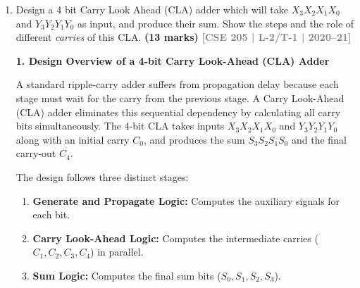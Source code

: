 \documentclass[12pt,a3paper]{article}
\newcommand{\yr}[1]{\hfill\textcolor{gray}{\small\textbf{[#1]}}}
\newcommand{\mk}[1]{\textcolor{orange!70!black}{\small\textbf{(#1 marks)}}}
\begin{document}
\begin{enumerate}
\begin{tcolorbox}[enhanced,breakable,ansbox,colback=cD!4,colframe=cD,boxrule=0.8pt,arc=5pt,title={\textbf{Answer}},fonttitle=\bfseries\color{white},colbacktitle=cD]
\vspace{0.5em}
\textbf{Carry 4 ($C_4$):} For $i = 3$
\begin{align*}
    C_4 &= G_3 + P_3 \cdot C_3 \\
    &= G_3 + P_3 \cdot (G_2 + P_2 \cdot G_1 + P_2 \cdot P_1 \cdot G_0 + P_2 \cdot P_1 \cdot P_0 \cdot C_0) \quad &&\text{(Substitute } C_3\text{)} \\
    \mathbf{C_4} &= \mathbf{G_3 + P_3 \cdot G_2 + P_3 \cdot P_2 \cdot G_1 + P_3 \cdot P_2 \cdot P_1 \cdot G_0 + P_3 \cdot P_2 \cdot P_1 \cdot P_0 \cdot C_0} \quad &&\text{(Distributive Law)}
\end{align*}

\vspace{0.5em}
\textbf{Summary of Results:}
The derivations yield the final expressions mathematically structured as Sum-of-Products (SOP). None of the carry signals ($C_1, C_2, C_3, C_4$) depend sequentially on the preceding full-adder outputs; they only require the base input signals ($G_i$, $P_i$, and $C_0$), allowing them to be synthesized simultaneously via rapid two-level logic hardware.

\end{tcolorbox}

\item Design a 4 bit Carry Look Ahead (CLA) adder which will take $X_3X_2X_1X_0$ and $Y_3Y_2Y_1Y_0$ as input, and produce their sum. Show the steps and the role of different \textit{carries} of this CLA.
\mk{13} \yr{CSE 205 | L-2/T-1 | 2020--21}

\begin{tcolorbox}[enhanced,breakable,ansbox,colback=cD!4,colframe=cD,boxrule=0.8pt,arc=5pt,title={\textbf{Answer}},fonttitle=\bfseries\color{white},colbacktitle=cD]

\textbf{1. Design Overview of a 4-bit Carry Look-Ahead (CLA) Adder}
\vspace{0.5em}

A standard ripple-carry adder suffers from propagation delay because each stage must wait for the carry from the previous stage. A Carry Look-Ahead (CLA) adder eliminates this sequential dependency by calculating all carry bits simultaneously. The 4-bit CLA takes inputs $X_3X_2X_1X_0$ and $Y_3Y_2Y_1Y_0$ along with an initial carry $C_0$, and produces the sum $S_3S_2S_1S_0$ and the final carry-out $C_4$.

The design follows three distinct stages:
\begin{enumerate}
    \item \textbf{Generate and Propagate Logic:} Computes the auxiliary signals for each bit.
    \item \textbf{Carry Look-Ahead Logic:} Computes the intermediate carries ($C_1, C_2, C_3, C_4$) in parallel.
    \item \textbf{Sum Logic:} Computes the final sum bits ($S_0, S_1, S_2, S_3$).
\end{enumerate}


\end{tcolorbox}
\end{enumerate}
\end{document}
